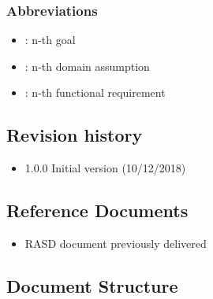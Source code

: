 \documentclass[DD.tex]{subfiles}
\begin{document}
\subsubsection{Abbreviations}
\begin{itemize}
	\item \begin{math}[Gn]\end{math}: n-th goal
	\item \begin{math}[Dn]\end{math}: n-th domain assumption 
	\item \begin{math}[Rn]\end{math}: n-th functional requirement
\end{itemize}

\subsection{Revision history}
\begin{itemize}
		\item 1.0.0 Initial version (10/12/2018)
\end{itemize}

\subsection{Reference Documents} 
\begin{itemize}
		\item RASD document previously delivered 
\end{itemize}

\subsection{Document Structure}

\newpage
\end{document}

